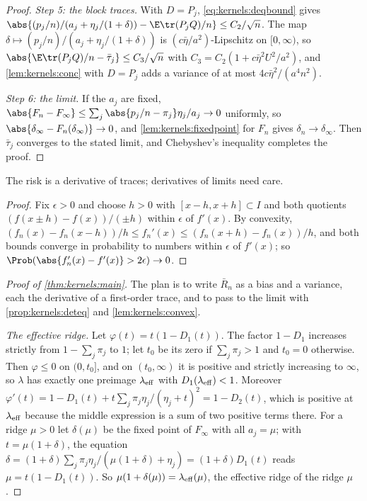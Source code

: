 \begin{refsection}
\begin{proof}
\emph{Step 5: the block traces.} With $D=P_j$, \eqref{eq:kernels:deqbound} gives $\abs{(p_j/n)/(a_j+\eta_j/(1+\delta))-\E\tr(P_jQ)/n}\le C_2/\sqrt n$. The map $\delta\mapsto(p_j/n)/(a_j+\eta_j/(1+\delta))$ is $(c\bar\eta/a^2)$-Lipschitz on $[0,\infty)$, so $\abs{\E\tr(P_jQ)/n-\bar\tau_j}\le C_3/\sqrt n$ with $C_3=C_2(1+c\bar\eta^2U^2/a^2)$, and \cref{lem:kernels:conc} with $D=P_j$ adds a variance of at most $4c\bar\eta^2/(a^4n^2)$.

\emph{Step 6: the limit.} If the $a_j$ are fixed, $\abs{F_n-F_\infty}\le\sum_j\abs{p_j/n-\pi_j}\eta_j/a_j\to0$ uniformly, so $\abs{\delta_\infty-F_n(\delta_\infty)}\to0$, and \cref{lem:kernels:fixedpoint} for $F_n$ gives $\delta_n\to\delta_\infty$. Then $\bar\tau_j$ converges to the stated limit, and Chebyshev's inequality completes the proof.
\end{proof}

The risk is a derivative of traces; derivatives of limits need care.


\begin{proof}
Fix $\epsilon>0$ and choose $h>0$ with $[x-h,x+h]\subset I$ and both quotients $(f(x\pm h)-f(x))/(\pm h)$ within $\epsilon$ of $f'(x)$. By convexity, $(f_n(x)-f_n(x-h))/h\le f_n'(x)\le(f_n(x+h)-f_n(x))/h$, and both bounds converge in probability to numbers within $\epsilon$ of $f'(x)$; so $\Prob(\abs{f_n'(x)-f'(x)}>2\epsilon)\to0$.
\end{proof}

\begin{proof}[Proof of \cref{thm:kernels:main}]
The plan is to write $\bar R_n$ as a bias and a variance, each the derivative of a first-order trace, and to pass to the limit with \cref{prop:kernels:deteq} and \cref{lem:kernels:convex}.

\emph{The effective ridge.} Let $\varphi(t)=t(1-D_1(t))$. The factor $1-D_1$ increases strictly from $1-\sum_j\pi_j$ to $1$; let $t_0$ be its zero if $\sum_j\pi_j>1$ and $t_0=0$ otherwise. Then $\varphi\le0$ on $(0,t_0]$, and on $(t_0,\infty)$ it is positive and strictly increasing to $\infty$, so $\lambda$ has exactly one preimage $\lambda_{\mathrm{eff}}$ with $D_1(\lambda_{\mathrm{eff}})<1$. Moreover $\varphi'(t)=1-D_1(t)+t\sum_j\pi_j\eta_j/(\eta_j+t)^2=1-D_2(t)$, which is positive at $\lambda_{\mathrm{eff}}$ because the middle expression is a sum of two positive terms there. For a ridge $\mu>0$ let $\delta(\mu)$ be the fixed point of $F_\infty$ with all $a_j=\mu$; with $t=\mu(1+\delta)$, the equation $\delta=(1+\delta)\sum_j\pi_j\eta_j/(\mu(1+\delta)+\eta_j)=(1+\delta)D_1(t)$ reads $\mu=t(1-D_1(t))$. So $\mu(1+\delta(\mu))=\lambda_{\mathrm{eff}}(\mu)$, the effective ridge of the ridge $\mu$.


\end{proof}
\end{refsection}

